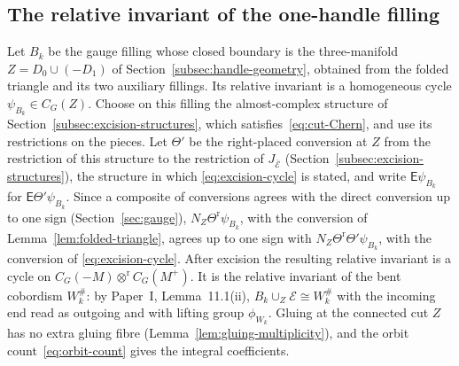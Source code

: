 \documentclass[11pt]{amsart}
\theoremstyle{definition}
\theoremstyle{remark}
\theoremstyle{plain}
\numberwithin{equation}{section}
\begin{document}
\subsection{The relative invariant of the one-handle filling}
Let $B_k$ be the gauge filling whose closed
boundary is the three-manifold $Z=D_0\cup(-D_1)$ of
Section~\ref{subsec:handle-geometry}, obtained from the folded
triangle and its two auxiliary fillings. Its
relative invariant is a homogeneous cycle
$\psi_{B_k}\in C_G(Z)$. Choose on this filling the almost-complex structure of Section~\ref{subsec:excision-structures}, which satisfies~\eqref{eq:cut-Chern}, and use its restrictions on the pieces. Let
$\Theta'$ be the right-placed conversion at $Z$
from the restriction of this structure to the
restriction of $J_{\overline{\mathcal E}}$ (Section~\ref{subsec:excision-structures}), the structure in which \eqref{eq:excision-cycle} is
stated, and write $\mathsf E\psi_{B_k}$ for
$\mathsf E\Theta'\psi_{B_k}$. Since a composite
of conversions agrees with the direct conversion
up to one sign (Section~\ref{sec:gauge}),
$N_Z\Theta^{\mathrm r}\psi_{B_k}$, with the
conversion of Lemma~\ref{lem:folded-triangle},
agrees up to one sign with
$N_Z\Theta^{\mathrm r}\Theta'\psi_{B_k}$, with the
conversion of \eqref{eq:excision-cycle}. After
excision the resulting relative invariant
is a cycle on
$C_G(-M)\otimes^{\mathrm r} C_G(M^+)$. It is the relative invariant of
the bent cobordism $W_k^\#$: by Paper~I,
Lemma~11.1(ii), $B_k\cup_Z\mathcal E\cong W_k^\#$
with the incoming end read as outgoing and with
lifting group $\phi_{W_k}$. Gluing at the connected
cut $Z$ has no extra gluing fibre
(Lemma~\ref{lem:gluing-multiplicity}), and the orbit
count~\eqref{eq:orbit-count} gives the integral
coefficients.
\end{document}
